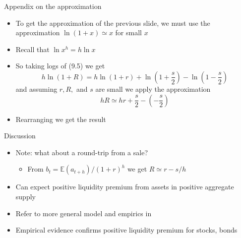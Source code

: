 \documentclass[english,10pt
,aspectratio=169
]{beamer}
\begin{document}
\begin{frame}{Appendix on the approximation}
	\begin{itemize}
		\item To get the approximation of the previous slide, we must use the approximation $\ln (1+x) \simeq x$ for small $x$
		\item Recall that $\ln x^h = h \ln x$
		\item So taking logs of (9.5) we get
		\[
		h \ln (1+R) = h\ln (1+r) + \ln(1+\frac{s}{2}) - \ln(1-\frac{s}{2}) 
		\]
		and assuming $r, R,$ and $s$ are small we apply the approximation
		\[
		hR \simeq hr+\frac{s}{2}- \left(-\frac{s}{2}\right)
		\]
		\item Rearranging we get the result
	\end{itemize}
\end{frame}


\begin{frame}{Discussion}
	\begin{itemize}
		\item Note: what about a round-trip from a sale?
		\begin{itemize}
			\item From $b_t=\mathbb{E}(a_{t+h})/(1+r)^h$ we get $R \simeq r-s/h$
		\end{itemize}
		\pause
		\pause[4]
		\item Can expect positive liquidity premium from assets in positive aggregate supply
		\item Refer to more general model and empirics in \citet*{bongaerts_derivative_2011}
		\item Empirical evidence confirms positive liquidity premium for stocks, bonds
	\end{itemize}
\end{frame}
\end{document}

